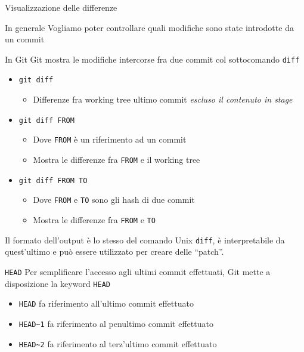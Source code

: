 \documentclass[xcolor=dvipsnames,presentation]{beamer}
\begin{document}
\begin{frame}{Visualizzazione delle differenze}
    \begin{block}{In generale}
        Vogliamo poter controllare quali modifiche sono state introdotte da un commit
    \end{block}
    \begin{block}{In Git}
        Git mostra le modifiche intercorse fra due commit col sottocomando \texttt{diff}
        \begin{itemize}
            \item \texttt{git diff}
            \begin{itemize}
                \item Differenze fra working tree ultimo commit \textit{escluso il contenuto in stage}
            \end{itemize}
            \item \texttt{git diff FROM}
            \begin{itemize}
                \item Dove \texttt{FROM} è un riferimento ad un commit
                \item Mostra le differenze fra \texttt{FROM} e il working tree
            \end{itemize}
            \item \texttt{git diff FROM TO}
            \begin{itemize}
                \item Dove \texttt{FROM} e \texttt{TO} sono gli hash di due commit
                \item Mostra le differenze fra \texttt{FROM} e \texttt{TO}
            \end{itemize}
        \end{itemize}
        Il formato dell'output è lo stesso del comando Unix \texttt{diff}, è interpretabile da quest'ultimo e può essere utilizzato per creare delle ``patch''.
    \end{block}
    \begin{block}{\texttt{HEAD}}
        Per semplificare l'accesso agli ultimi commit effettuati, Git mette a disposizione la keyword \texttt{HEAD}
        \begin{itemize}
            \item \texttt{HEAD} fa riferimento all'ultimo commit effettuato
            \item \texttt{HEAD\textasciitilde{}1} fa riferimento al penultimo commit effettuato
            \item \texttt{HEAD\textasciitilde{}2} fa riferimento al terz'ultimo commit effettuato

\end{itemize}
\end{block}
\end{frame}
\end{document}
